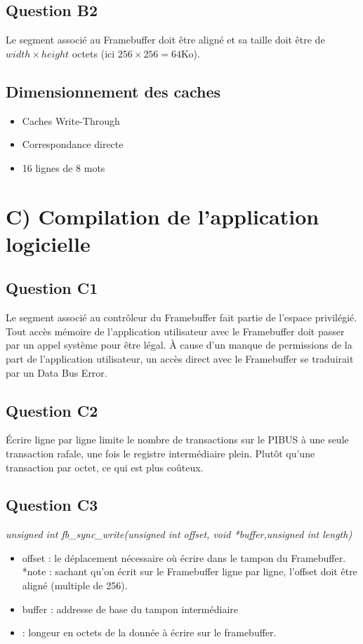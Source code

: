 \documentclass[10pt]{article}
\begin{document}
\subsection{Question B2}
Le segment associé au Framebuffer doit être aligné et sa taille doit être de
${width}\times{height}$ octets (ici ${256}\times{256}=64$Ko).

\subsection{Dimensionnement des caches}
\begin{itemize}
  \item Caches Write-Through
  \item Correspondance directe
  \item 16 lignes de 8 mots
  
\end{itemize}

\section{C) Compilation de l'application logicielle}
\subsection{Question C1}
Le segment associé au contrôleur du Framebuffer fait partie de l'espace
privilégié. Tout accès mémoire de l'application utilisateur avec le Framebuffer
doit passer par un appel système pour être légal. À cause d'un manque de
permissions de la part de l'application utilisateur, un accès direct avec le
Framebuffer se traduirait par un Data Bus Error.

\subsection{Question C2}
Écrire ligne par ligne limite le nombre de transactions sur le PIBUS à une seule
transaction rafale, une fois le registre intermédiaire plein. Plutôt qu'une
transaction par octet, ce qui est plus coûteux.

\subsection{Question C3}
{\it unsigned int fb\_sync\_write(unsigned int offset, void *buffer,unsigned int length)}
\begin{itemize}
  \item offset : le déplacement nécessaire où écrire dans le tampon du
  Framebuffer.\\
  *note : sachant qu'on écrit sur le Framebuffer ligne par ligne, l'offset doit
  être aligné (multiple de 256).
  \item buffer : addresse de base du tampon intermédiaire
  \item : longeur en octets de la donnée à écrire sur le framebuffer.
\end{itemize}
\end{document}
